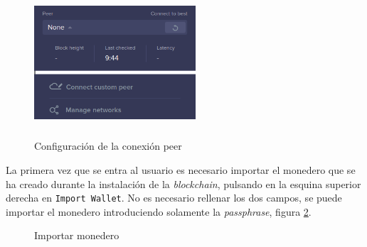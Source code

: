 \begin{figure}[H]
	\centering
	\begin{minipage}{0.3\textwidth}
		\includegraphics[width=6cm,height=5.5cm]{figuras/wallet_11.png}
	\end{minipage}\hfill
	\begin{minipage}{0.5\textwidth}
	\end{minipage}
	\caption{Configuración de la conexión peer}
	\label{fig:wallet-11-12}
\end{figure}

La primera vez que se entra al usuario es necesario importar el monedero que se ha creado durante la instalación de la \textit{blockchain}, pulsando en la esquina superior derecha en \texttt{Import Wallet}. No es necesario rellenar los dos campos, se puede importar el monedero introduciendo solamente la \textit{passphrase}, figura \ref{fig:wallet-8}.

\begin{figure}[H]
	\centering
	\caption{Importar monedero}
	\label{fig:wallet-8}
\end{figure}

